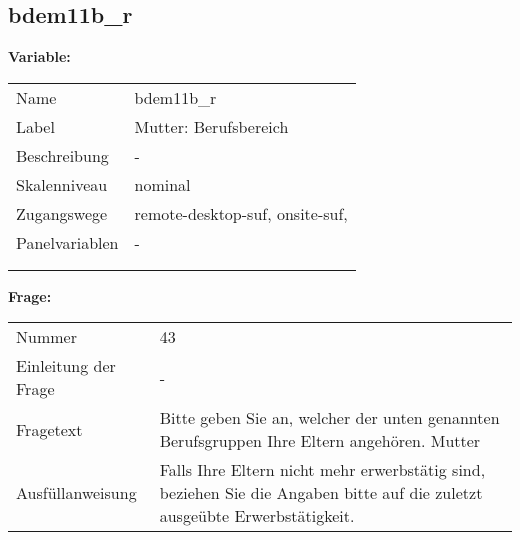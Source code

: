 	
	
	\subsection{bdem11b\_r}
	\label{subSection:bdem11b_r}

	\noindent\textbf{Variable:}\\
		\begin{tabular}{lL{11.3cm}}
			\label{tableVariable:bdem11b_r}
			Name & bdem11b\_r \\
			Label & Mutter: Berufsbereich \\
			Beschreibung & - \\
			Skalenniveau & nominal \\
			Zugangswege &
				remote-desktop-suf,
				onsite-suf,
 \\
			Panelvariablen & -
			 \\
			 \\
 \\
		\end{tabular}

		\vspace*{1 cm}
		\noindent\textbf{Frage:}\\
		\begin{tabular}{lL{11.3cm}}
			\label{tableQuestion:bdem11b_r}
			Nummer & 43 \\
			Einleitung der Frage & - \\
			Fragetext & Bitte geben Sie an, welcher der unten genannten Berufsgruppen Ihre Eltern angehören.
Mutter \\
			Ausfüllanweisung & Falls Ihre Eltern nicht mehr erwerbstätig sind, beziehen Sie die Angaben bitte auf die zuletzt ausgeübte Erwerbstätigkeit. \\
		\end{tabular}






